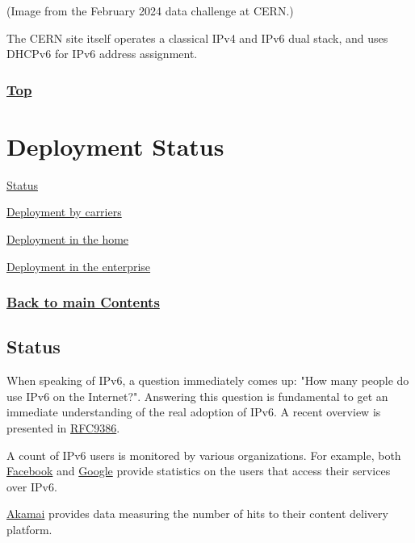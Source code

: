 \documentclass[
]{article}
\begin{document}
(Image from the February 2024 data challenge at CERN.)

The CERN site itself operates a classical IPv4 and IPv6 dual stack, and
uses DHCPv6 for IPv6 address assignment.

\subsubsection{\texorpdfstring{\hyperref[case-studies]{Top}}{Top}}\label{top-1}

\pagebreak

\section{Deployment Status}\label{deployment-status}

\hyperref[status]{Status}

\hyperref[deployment-by-carriers]{Deployment by carriers}

\hyperref[deployment-in-the-home]{Deployment in the home}

\hyperref[deployment-in-the-enterprise]{Deployment in the enterprise}

\subsubsection{\texorpdfstring{\hyperref[list-of-contents]{Back to main
Contents}}{Back to main Contents}}\label{back-to-main-contents-7}

\pagebreak

\subsection{Status}\label{status}

When speaking of IPv6, a question immediately comes up: "How many people
do use IPv6 on the Internet?". Answering this question is fundamental to
get an immediate understanding of the real adoption of IPv6. A recent
overview is presented in
\href{https://www.rfc-editor.org/info/rfc9386}{RFC9386}.

A count of IPv6 users is monitored by various organizations. For
example, both
\href{https://www.facebook.com/ipv6/?tab=ipv6_total_adoption}{Facebook}
and \href{https://www.google.com/intl/en/ipv6/statistics.html}{Google}
provide statistics on the users that access their services over IPv6.

\href{https://www.akamai.com/internet-station/cyber-attacks/state-of-the-internet-report/ipv6-adoption-visualization}{Akamai}
provides data measuring the number of hits to their content delivery
platform.
\end{document}
